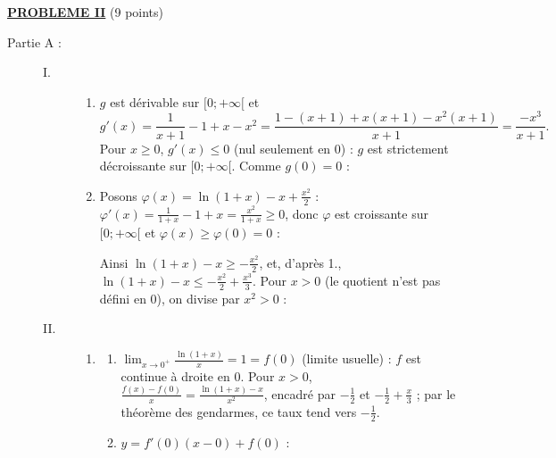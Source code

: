 \noindent \underline{\textsc{\textbf{PROBLEME II}}} (9 points)
\begin{description}
	\item[Partie A :]
	\begin{description}
		\item[I. ]
		\begin{enumerate}
			\item {}
				$g$ est dérivable sur $[0;+\infty[$ et
				\[
					g'(x) = \frac{1}{x+1} - 1 + x - x^2 = \frac{1 - (x+1) + x(x+1) - x^2(x+1)}{x+1} = \frac{-x^3}{x+1} .
				\]
				Pour $x \geq 0$, $g'(x) \leq 0$ (nul seulement en $0$) : $g$ est strictement décroissante sur $[0;+\infty[$. Comme $g(0) = 0$ :
				\par\noindent{}
			\item {}
				Posons $\varphi(x) = \ln(1+x) - x + \frac{x^2}{2}$ : $\varphi'(x) = \frac{1}{1+x} - 1 + x = \frac{x^2}{1+x} \geq 0$,
				donc $\varphi$ est croissante sur $[0;+\infty[$ et $\varphi(x) \geq \varphi(0) = 0$ :
				\par\noindent{}
				Ainsi $\ln(1+x) - x \geq -\frac{x^2}{2}$, et, d'après 1., $\ln(1+x) - x \leq -\frac{x^2}{2} + \frac{x^3}{3}$.
				Pour $x > 0$ (le quotient n'est pas défini en $0$), on divise par $x^2 > 0$ :
				\par\noindent{}
		\end{enumerate}
		\item[II. ]
		\begin{enumerate}
			\item
			\begin{enumerate}
				\item {}
					$\lim_{x\to 0^+} \frac{\ln(1+x)}{x} = 1 = f(0)$ (limite usuelle) : $f$ est continue à droite en $0$.
					Pour $x > 0$, $\frac{f(x) - f(0)}{x} = \frac{\ln(1+x) - x}{x^2}$, encadré par $-\frac{1}{2}$ et $-\frac{1}{2} + \frac{x}{3}$ ;
					par le théorème des gendarmes, ce taux tend vers $-\frac{1}{2}$.
					\par\noindent{}
				\item {}
					$y = f'(0)(x - 0) + f(0)$ : \par\noindent{}

\end{enumerate}
\end{enumerate}
\end{description}
\end{description}
